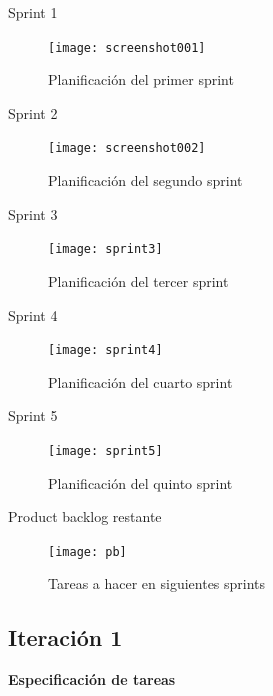 Sprint 1 \\ 
\begin{figure}[H]
	\centering
	\texttt{[image: screenshot001]}
	\caption{Planificación del primer sprint}
	\label{fig:sprint1}
\end{figure}


Sprint 2 \\
\begin{figure}[H]
	\centering
	\texttt{[image: screenshot002]}
	\caption{Planificación del segundo sprint}
	\label{fig:sprint2}
\end{figure} 


Sprint 3 \\ 
\begin{figure}[H]
	\centering
	\texttt{[image: sprint3]}
	\caption{Planificación del tercer sprint}
	\label{fig:sprint3}
\end{figure}

Sprint 4 \\
\begin{figure}[H]
	\centering
	\texttt{[image: sprint4]}
	\caption{Planificación del cuarto sprint}
	\label{fig:sprint4}
\end{figure}

Sprint 5 \\ 
\begin{figure}[H]
	\centering
	\texttt{[image: sprint5]}
	\caption{Planificación del quinto sprint}
	\label{fig:sprint5}
\end{figure}

Product backlog restante \\
\begin{figure}[H]
	\centering
	\texttt{[image: pb]}
	\caption{Tareas a hacer en siguientes sprints}
	\label{fig:pb_restante}
\end{figure}





\subsection{Iteración 1}

\large{\textbf{Especificación de tareas}} \\


